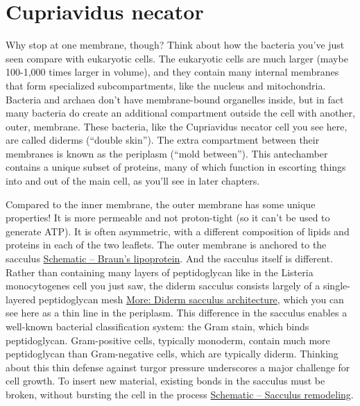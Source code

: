 \documentclass[]{tufte-book}
\begin{document}
\hypertarget{cupriavidus-necator}{%
\section{Cupriavidus necator}\label{cupriavidus-necator}}

Why stop at one membrane, though? Think about how the bacteria you've just seen compare with eukaryotic cells. The eukaryotic cells are much larger (maybe 100-1,000 times larger in volume), and they contain many internal membranes that form specialized subcompartments, like the nucleus and mitochondria. Bacteria and archaea don't have membrane-bound organelles inside, but in fact many bacteria do create an additional compartment outside the cell with another, outer, membrane. These bacteria, like the Cupriavidus necator cell you see here, are called diderms (``double skin''). The extra compartment between their membranes is known as the periplasm (``mold between''). This antechamber contains a unique subset of proteins, many of which function in escorting things into and out of the main cell, as you'll see in later chapters.

Compared to the inner membrane, the outer membrane has some unique properties! It is more permeable and not proton-tight (so it can't be used to generate ATP). It is often asymmetric, with a different composition of lipids and proteins in each of the two leaflets. The outer membrane is anchored to the sacculus \protect\hyperlink{fig:2-3-1}{Schematic -- Braun's lipoprotein}. And the sacculus itself is different. Rather than containing many layers of peptidoglycan like in the Listeria monocytogenes cell you just saw, the diderm sacculus consists largely of a single-layered peptidoglycan mesh \protect\hyperlink{Diderm_sacculus_architecture}{More: Diderm sacculus architecture}, which you can see here as a thin line in the periplasm. This difference in the sacculus enables a well-known bacterial classification system: the Gram stain, which binds peptidoglycan. Gram-positive cells, typically monoderm, contain much more peptidoglycan than Gram-negative cells, which are typically diderm. Thinking about this thin defense against turgor pressure underscores a major challenge for cell growth. To insert new material, existing bonds in the sacculus must be broken, without bursting the cell in the process \protect\hyperlink{fig:2-3-2}{Schematic -- Sacculus remodeling}.

\hypertarget{htmlwidget-b9bfd56c0eccebc9e242}{}
\end{document}
